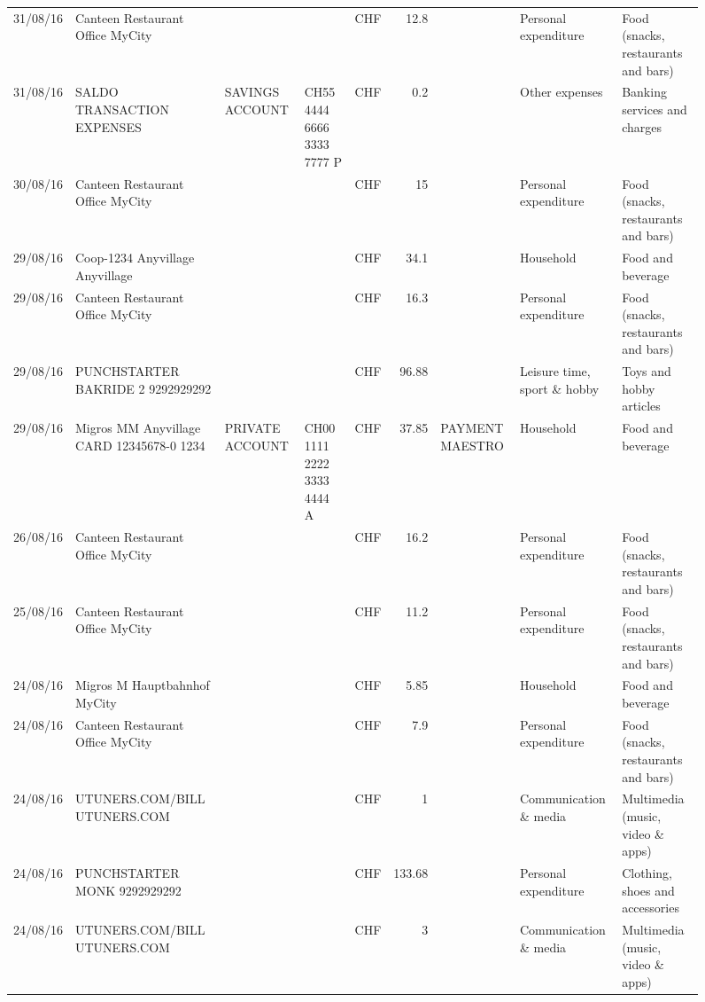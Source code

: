\begin{landscape}
\begin{sidewaysfigure}
\begin{table}[h]
\begin{center}
\begin{tabular}{rllllrlll}
		31/08/16 & Canteen Restaurant Office      MyCity &       &       & CHF   & 12.8  &       & Personal expenditure & Food (snacks, restaurants and bars) \\
		31/08/16 & SALDO TRANSACTION EXPENSES & SAVINGS ACCOUNT & CH55 4444 6666 3333 7777 P & CHF   & 0.2   &       & Other expenses & Banking services and charges \\
		30/08/16 & Canteen Restaurant Office      MyCity &       &       & CHF   & 15    &       & Personal expenditure & Food (snacks, restaurants and bars) \\
		29/08/16 & Coop-1234 Anyvillage    Anyvillage &       &       & CHF   & 34.1  &       & Household & Food and beverage \\
		29/08/16 & Canteen Restaurant Office      MyCity &       &       & CHF   & 16.3  &       & Personal expenditure & Food (snacks, restaurants and bars) \\
		29/08/16 & PUNCHSTARTER BAKRIDE 2   9292929292 &       &       & CHF   & 96.88 &       & Leisure time, sport \& hobby & Toys and hobby articles \\
		29/08/16 & Migros MM Anyvillage CARD 12345678-0 1234 & PRIVATE ACCOUNT & CH00 1111 2222 3333 4444 A & CHF   & 37.85 & PAYMENT MAESTRO & Household & Food and beverage \\
		26/08/16 & Canteen Restaurant Office      MyCity &       &       & CHF   & 16.2  &       & Personal expenditure & Food (snacks, restaurants and bars) \\
		25/08/16 & Canteen Restaurant Office      MyCity &       &       & CHF   & 11.2  &       & Personal expenditure & Food (snacks, restaurants and bars) \\
		24/08/16 & Migros M Hauptbahnhof    MyCity &       &       & CHF   & 5.85  &       & Household & Food and beverage \\
		24/08/16 & Canteen Restaurant Office      MyCity &       &       & CHF   & 7.9   &       & Personal expenditure & Food (snacks, restaurants and bars) \\
		24/08/16 & UTUNERS.COM/BILL          UTUNERS.COM &       &       & CHF   & 1     &       & Communication \& media & Multimedia (music, video \& apps) \\
		24/08/16 & PUNCHSTARTER MONK   9292929292 &       &       & CHF   & 133.68 &       & Personal expenditure & Clothing, shoes and accessories \\
		24/08/16 & UTUNERS.COM/BILL          UTUNERS.COM &       &       & CHF   & 3     &       & Communication \& media & Multimedia (music, video \& apps) \\

\end{tabular}
\end{center}
\end{table}
\end{sidewaysfigure}
\end{landscape}
